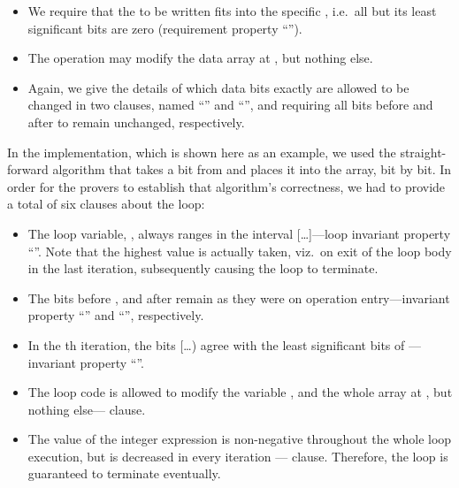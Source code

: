 \FloatBarrier

\begin{itemize}
\item We require that the  to be written fits into
the specific
	, i.e.\ all but its 
	least significant bits are
	zero (requirement property ``'').
\item The operation may modify the data array at ,
but nothing else.
\item Again, we give the details of which data bits exactly
	are allowed to be changed in two
	 clauses, named ``'' and
	``'', and requiring all bits before
	 and after
	 to remain unchanged, respectively.
\end{itemize}

In the implementation, which is shown here as an example, we used
the straight-forward
algorithm that takes a bit from  and places it into
the  array, bit by bit.
%
In order for the provers to establish that algorithm's correctness,
we had to provide a total of six \acsl clauses about the loop:
%
\begin{itemize}
\item The loop variable, , always ranges in the interval
	[\ldots{}]---loop invariant property ``''.
	Note that the highest value is actually taken,
	viz.\ on exit of the loop body in the last iteration,
	subsequently causing the loop to terminate.
\item The bits before , and after
	remain as they were on operation entry---invariant property
	``'' and ``'', respectively.
\item In the th iteration, the bits
	[\ldots{}) agree with
	the least significant
	 bits of ---invariant property
	``''.
\item The loop code is allowed to modify the variable ,
	and the whole array
	at , but nothing else---
	 clause.
\item The value of the integer
	expression  is non-negative throughout
	the whole loop execution, but is decreased in every iteration 
	---  clause.
	Therefore, the loop is guaranteed to terminate eventually.
\end{itemize}




